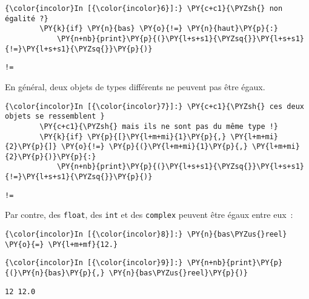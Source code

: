     \begin{Verbatim}[commandchars=\\\{\}]
{\color{incolor}In [{\color{incolor}6}]:} \PY{c+c1}{\PYZsh{} non égalité ?}
        \PY{k}{if} \PY{n}{bas} \PY{o}{!=} \PY{n}{haut}\PY{p}{:}
            \PY{n+nb}{print}\PY{p}{(}\PY{l+s+s1}{\PYZsq{}}\PY{l+s+s1}{!=}\PY{l+s+s1}{\PYZsq{}}\PY{p}{)}
\end{Verbatim}


    \begin{Verbatim}[commandchars=\\\{\}]
!=

    \end{Verbatim}

    En général, deux objets de types différents ne peuvent pas être égaux.

    \begin{Verbatim}[commandchars=\\\{\}]
{\color{incolor}In [{\color{incolor}7}]:} \PY{c+c1}{\PYZsh{} ces deux objets se ressemblent }
        \PY{c+c1}{\PYZsh{} mais ils ne sont pas du même type !}
        \PY{k}{if} \PY{p}{[}\PY{l+m+mi}{1}\PY{p}{,} \PY{l+m+mi}{2}\PY{p}{]} \PY{o}{!=} \PY{p}{(}\PY{l+m+mi}{1}\PY{p}{,} \PY{l+m+mi}{2}\PY{p}{)}\PY{p}{:}
            \PY{n+nb}{print}\PY{p}{(}\PY{l+s+s1}{\PYZsq{}}\PY{l+s+s1}{!=}\PY{l+s+s1}{\PYZsq{}}\PY{p}{)}
\end{Verbatim}


    \begin{Verbatim}[commandchars=\\\{\}]
!=

    \end{Verbatim}

    Par contre, des \texttt{float}, des \texttt{int} et des \texttt{complex}
peuvent être égaux entre eux~:

    \begin{Verbatim}[commandchars=\\\{\}]
{\color{incolor}In [{\color{incolor}8}]:} \PY{n}{bas\PYZus{}reel} \PY{o}{=} \PY{l+m+mf}{12.}
\end{Verbatim}


    \begin{Verbatim}[commandchars=\\\{\}]
{\color{incolor}In [{\color{incolor}9}]:} \PY{n+nb}{print}\PY{p}{(}\PY{n}{bas}\PY{p}{,} \PY{n}{bas\PYZus{}reel}\PY{p}{)}
\end{Verbatim}


    \begin{Verbatim}[commandchars=\\\{\}]
12 12.0

    \end{Verbatim}

